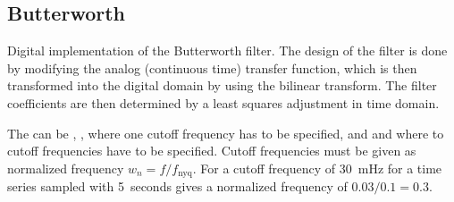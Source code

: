 \subsection{Butterworth}
Digital implementation of the Butterworth filter. The design of the filter is done by modifying the analog (continuous time) transfer function, which is
then transformed into the digital domain by using the bilinear transform. The filter coefficients are then determined by a least squares adjustment in time domain.

The  can be , , where one cutoff frequency has to be specified, and  and  where to cutoff frequencies have to be specified.
Cutoff frequencies must be given as normalized frequency $w_n = f/f_{\text{nyq}}$. For a cutoff frequency of 30~mHz for a time series sampled with 5~seconds gives a normalized frequency of $0.03/0.1 = 0.3$.


